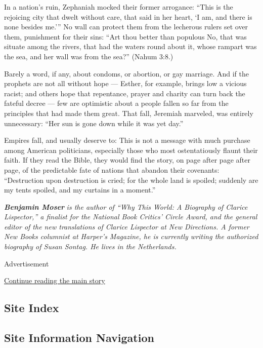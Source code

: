 In a nation's ruin, Zephaniah mocked their former arrogance: ``This is
the rejoicing city that dwelt without care, that said in her heart, `I
am, and there is none besides me.' '' No wall can protect them from the
lecherous rulers set over them, punishment for their sins: ``Art thou
better than populous No, that was situate among the rivers, that had the
waters round about it, whose rampart was the sea, and her wall was from
the sea?'' (Nahum 3:8.)

Barely a word, if any, about condoms, or abortion, or gay marriage. And
if the prophets are not all without hope --- Esther, for example, brings
low a vicious racist; and others hope that repentance, prayer and
charity can turn back the fateful decree --- few are optimistic about a
people fallen so far from the principles that had made them great. That
fall, Jeremiah marveled, was entirely unnecessary: ``Her sun is gone
down while it was yet day.''

Empires fall, and usually deserve to: This is not a message with much
purchase among American politicians, especially those who most
ostentatiously flaunt their faith. If they read the Bible, they would
find the story, on page after page after page, of the predictable fate
of nations that abandon their covenants: ``Destruction upon destruction
is cried; for the whole land is spoiled; suddenly are my tents spoiled,
and my curtains in a moment.''

\emph{\textbf{Benjamin Moser}} \emph{is the author of ``Why This World:
A Biography of Clarice Lispector,'' a finalist for the National Book
Critics' Circle Award, and the general editor of the new translations of
Clarice Lispector at New Directions. A former New Books columnist at
Harper's Magazine, he is currently writing the authorized biography of
Susan Sontag. He lives in the Netherlands.}

Advertisement

\protect\hyperlink{after-bottom}{Continue reading the main story}

\hypertarget{site-index}{%
\subsection{Site Index}\label{site-index}}

\hypertarget{site-information-navigation}{%
\subsection{Site Information
Navigation}\label{site-information-navigation}}


